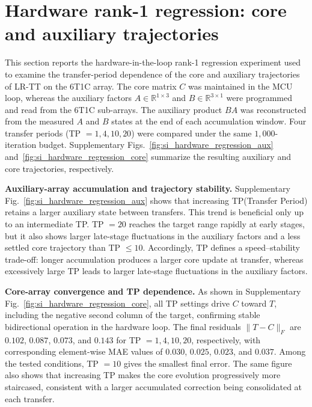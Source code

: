 \documentclass[fleqn,10pt]{wlscirep}
\newcommand{\SIEndSection}{\FloatBarrier\clearpage}
\begin{document}
\SIEndSection
\section[Hardware rank-1 regression: core and auxiliary trajectories]
{Hardware rank-1 regression: core and auxiliary trajectories}
\label{sec:si_hardware_regression}

\noindent
This section reports the hardware-in-the-loop rank-1 regression experiment used to examine the transfer-period dependence of the core and auxiliary trajectories of LR-TT on the 6T1C array. The core matrix $C$ was maintained in the MCU loop, whereas the auxiliary factors $A\in\mathbb{R}^{1\times3}$ and $B\in\mathbb{R}^{3\times1}$ were programmed and read from the 6T1C sub-arrays. The auxiliary product $BA$ was reconstructed from the measured $A$ and $B$ states at the end of each accumulation window. Four transfer periods (TP $=1,4,10,20$) were compared under the same $1{,}000$-iteration budget. Supplementary Figs.~\ref{fig:si_hardware_regression_aux} and~\ref{fig:si_hardware_regression_core} summarize the resulting auxiliary and core trajectories, respectively.

\noindent\textbf{Auxiliary-array accumulation and trajectory stability.}
Supplementary Fig.~\ref{fig:si_hardware_regression_aux} shows that increasing TP(Transfer Period) retains a larger auxiliary state between transfers. This trend is beneficial only up to an intermediate TP. TP $=20$ reaches the target range rapidly at early stages, but it also shows larger late-stage fluctuations in the auxiliary factors and a less settled core trajectory than TP $\le 10$. Accordingly, TP defines a speed--stability trade-off: longer accumulation produces a larger core update at transfer, whereas excessively large TP leads to larger late-stage fluctuations in the auxiliary factors.

\noindent\textbf{Core-array convergence and TP dependence.}
As shown in Supplementary Fig.~\ref{fig:si_hardware_regression_core}, all TP settings drive $C$ toward $T$, including the negative second column of the target, confirming stable bidirectional operation in the hardware loop. The final residuals $\|T-C\|_F$ are $0.102$, $0.087$, $0.073$, and $0.143$ for TP $=1,4,10,20$, respectively, with corresponding element-wise MAE values of $0.030$, $0.025$, $0.023$, and $0.037$. Among the tested conditions, TP $=10$ gives the smallest final error. The same figure also shows that increasing TP makes the core evolution progressively more staircased, consistent with a larger accumulated correction being consolidated at each transfer.
\end{document}
